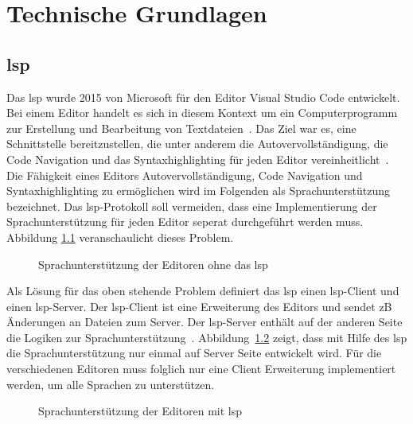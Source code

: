 \chapter{Technische Grundlagen}\label{ch:technical-basics}

\section{\acs{lsp}}

Das \ac{lsp} wurde 2015 von Microsoft für den Editor Visual Studio Code entwickelt.
Bei einem Editor handelt es sich in diesem Kontext um ein Computerprogramm zur Erstellung und Bearbeitung von Textdateien~\cite{editor-definition}.
Das Ziel war es, eine Schnittstelle bereitzustellen, die unter anderem die Autovervollständigung, die Code Navigation und das Syntaxhighlighting
für jeden Editor vereinheitlicht~\cite{lsp-witekio}.
Die Fähigkeit eines Editors Autovervollständigung, Code Navigation und Syntaxhighlighting zu ermöglichen wird im Folgenden als Sprachunterstützung bezeichnet.
Das \ac{lsp}-Protokoll soll vermeiden, dass eine Implementierung der Sprachunterstützung für jeden Editor seperat durchgeführt werden muss.
Abbildung \ref{fig:without-lsp} veranschaulicht dieses Problem.

\begin{figure}[htp] %
    \centering
    \caption{Sprachunterstützung der Editoren ohne das \acs{lsp}}
    \label{fig:without-lsp}
\end{figure}

Als Lösung für das oben stehende Problem definiert das \ac{lsp} einen \ac{lsp}-Client und einen \ac{lsp}-Server.
Der \ac{lsp}-Client ist eine Erweiterung des Editors und sendet \ac{zB} Änderungen an Dateien zum Server.
Der \ac{lsp}-Server enthält auf der anderen Seite die Logiken zur Sprachunterstützung~\cite{lsp-witekio}.
Abbildung~\ref{fig:with-lsp} zeigt, dass mit Hilfe des \ac{lsp} die Sprachunterstützung nur einmal auf Server Seite entwickelt wird.
Für die verschiedenen Editoren muss folglich nur eine Client Erweiterung implementiert werden, um alle Sprachen zu unterstützen.

\begin{figure}[htp] %
    \centering
    \caption{Sprachunterstützung der Editoren mit \acs{lsp}}
    \label{fig:with-lsp}
\end{figure}

